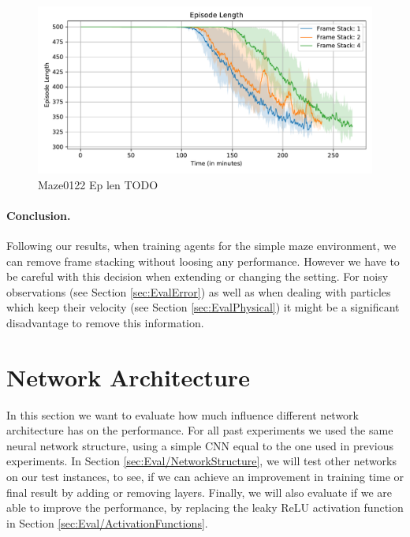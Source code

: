 \begin{figure}[htp]
    \begin{center}
        \includegraphics[clip, width=0.8\columnwidth]{figures/evaluation/observations/maze0122_frame_stack_ep_len.pdf}
    \end{center}
    \caption{Maze0122 Ep len TODO} \label{fig:Eval/FrameStacking/Maze0122}
\end{figure}

\paragraph{Conclusion. } Following our results, when training agents for the simple maze environment, we can remove frame stacking without loosing any performance. However we have to be careful with this decision when extending or changing the setting. For noisy observations (see Section \ref{sec:EvalError}) as well as when dealing with particles which keep their velocity (see Section \ref{sec:EvalPhysical}) it might be a significant disadvantage to remove this information. 


\section{Network Architecture} \label{sec:EvalNetworks}
In this section we want to evaluate how much influence different network architecture has on the performance. For all past experiments we used the same neural network structure, using a simple CNN equal to the one used in previous experiments. In Section \ref{sec:Eval/NetworkStructure}, we will test other networks on our test instances, to see, if we can achieve an improvement in training time or final result by adding or removing layers. Finally, we will also evaluate if we are able to improve the performance, by replacing the leaky ReLU activation function in Section \ref{sec:Eval/ActivationFunctions}.


